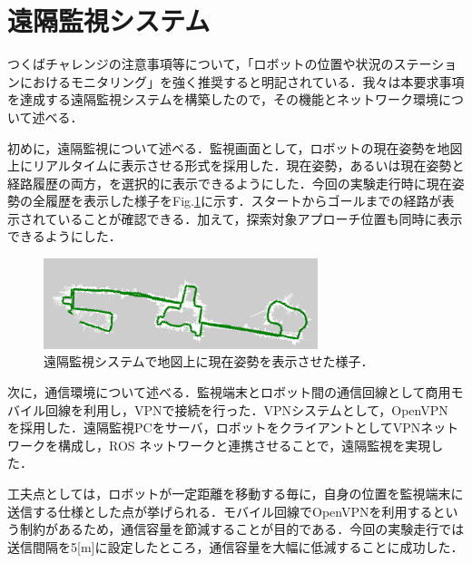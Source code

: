 \documentclass[10pt,a4paper]{jarticle}
\begin{document}
\section{遠隔監視システム}
つくばチャレンジの注意事項等について，「ロボットの位置や状況のステーションにおけるモニタリング」を強く推奨すると明記されている．我々は本要求事項を達成する遠隔監視システムを構築したので，その機能とネットワーク環境について述べる．

初めに，遠隔監視について述べる．監視画面として，ロボットの現在姿勢を地図上にリアルタイムに表示させる形式を採用した．現在姿勢，あるいは現在姿勢と経路履歴の両方，を選択的に表示できるようにした．今回の実験走行時に現在姿勢の全履歴を表示した様子をFig.\ref{monitor}に示す．スタートからゴールまでの経路が表示されていることが確認できる．加えて，探索対象アプローチ位置も同時に表示できるようにした．

\begin{figure}
    \centering
    \includegraphics[width=8cm]{fig/png/monitor.png}
    \caption{遠隔監視システムで地図上に現在姿勢を表示させた様子．}
    \label{monitor}
\end{figure}

次に，通信環境について述べる．監視端末とロボット間の通信回線として商用モバイル回線を利用し，VPNで接続を行った．VPNシステムとして，OpenVPN \cite{openvpn} を採用した．遠隔監視PCをサーバ，ロボットをクライアントとしてVPNネットワークを構成し，ROS ネットワークと連携させることで，遠隔監視を実現した．

工夫点としては，ロボットが一定距離を移動する毎に，自身の位置を監視端末に送信する仕様とした点が挙げられる．モバイル回線でOpenVPNを利用するという制約があるため，通信容量を節減することが目的である．今回の実験走行では送信間隔を5[m]に設定したところ，通信容量を大幅に低減することに成功した．
\end{document}
